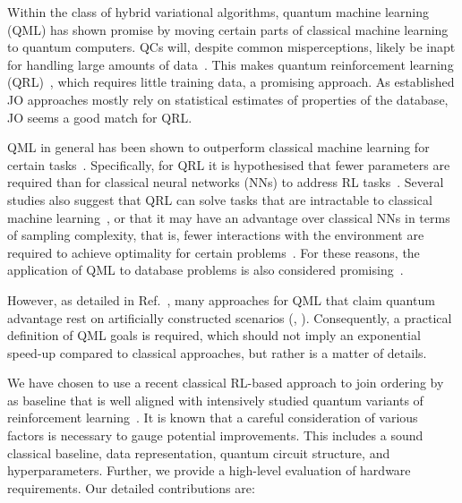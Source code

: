 \documentclass[10pt, conference]{IEEEtran}
\begin{document}
Within the class of hybrid variational algorithms, quantum machine learning (QML) has shown promise by moving certain parts of classical machine learning to quantum computers.
QCs will, despite common misperceptions, likely be inapt for handling large amounts of data~\cite{hoefler23}. This makes quantum reinforcement learning (QRL)~\cite{chen20, skolik22, franz22}, which requires little training data, a promising approach.
As established JO approaches mostly rely on statistical estimates
of properties of the database, JO seems a good match for QRL.

QML in general has been shown to outperform classical machine learning for certain tasks~\cite{dilip22, huang22, du20, huang21, liu21, sweke21, havl19}.
Specifically, for QRL it is hypothesised that fewer parameters are required than for classical neural networks (NNs) to address RL tasks~\cite{lockwood20, chen20}.
Several studies also suggest that QRL can solve tasks that are intractable to classical machine learning~\cite{jerbi21}, or that it may have an advantage over classical NNs in terms of sampling complexity, that is, fewer interactions with the environment are required to achieve optimality for certain problems~\cite{skolik22, franz22}.
For these reasons, the application of QML to database problems is also considered promising~\cite{calikyilmaz23}.

However, as detailed in Ref.~\cite{schuld22}, many approaches for QML that claim quantum advantage rest on artificially constructed scenarios (\eg, \cite{havl19, huang21, liu21}).
Consequently, a practical definition of QML goals is required, which should not imply an exponential speed-up compared to classical approaches, but rather is a matter of details.

We have chosen to use a recent classical
RL-based approach to join ordering by \mapa~\cite{marcus18} as
baseline that is well aligned with intensively studied quantum variants
of reinforcement learning~\cite{meyer22}.
It is known that a careful consideration of various factors is necessary to gauge
potential improvements.
This includes a sound classical baseline, data representation, quantum circuit structure, and hyperparameters.
Further, we provide a high-level evaluation of hardware requirements. Our detailed contributions are:
\end{document}

